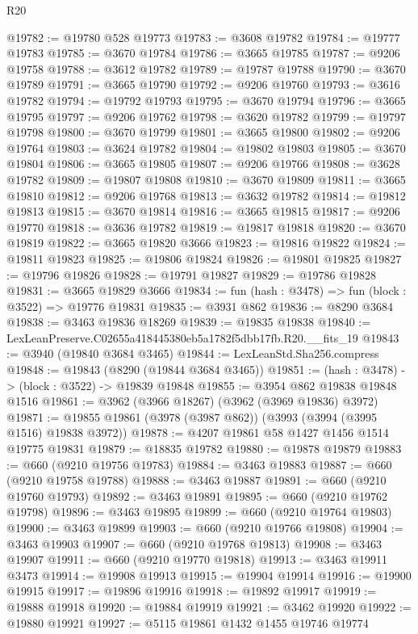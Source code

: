 \begin{lexlean}{R20}
\begin{coremodule}
@19782 := @19780 @528 @19773
@19783 := @3608 @19782
@19784 := @19777 @19783
@19785 := @3670 @19784
@19786 := @3665 @19785
@19787 := @9206 @19758
@19788 := @3612 @19782
@19789 := @19787 @19788
@19790 := @3670 @19789
@19791 := @3665 @19790
@19792 := @9206 @19760
@19793 := @3616 @19782
@19794 := @19792 @19793
@19795 := @3670 @19794
@19796 := @3665 @19795
@19797 := @9206 @19762
@19798 := @3620 @19782
@19799 := @19797 @19798
@19800 := @3670 @19799
@19801 := @3665 @19800
@19802 := @9206 @19764
@19803 := @3624 @19782
@19804 := @19802 @19803
@19805 := @3670 @19804
@19806 := @3665 @19805
@19807 := @9206 @19766
@19808 := @3628 @19782
@19809 := @19807 @19808
@19810 := @3670 @19809
@19811 := @3665 @19810
@19812 := @9206 @19768
@19813 := @3632 @19782
@19814 := @19812 @19813
@19815 := @3670 @19814
@19816 := @3665 @19815
@19817 := @9206 @19770
@19818 := @3636 @19782
@19819 := @19817 @19818
@19820 := @3670 @19819
@19822 := @3665 @19820 @3666
@19823 := @19816 @19822
@19824 := @19811 @19823
@19825 := @19806 @19824
@19826 := @19801 @19825
@19827 := @19796 @19826
@19828 := @19791 @19827
@19829 := @19786 @19828
@19831 := @3665 @19829 @3666
@19834 := fun (hash : @3478) => fun (block : @3522) => @19776 @19831
@19835 := @3931 @862
@19836 := @8290 @3684
@19838 := @3463 @19836 @18269
@19839 := @19835 @19838
@19840 := LexLeanPreserve.C02655a418445380eb5a1782f5dbb17fb.R20.__fits_19
@19843 := @3940 (@19840 @3684 @3465)
@19844 := LexLeanStd.Sha256.compress
@19848 := @19843 (@8290 (@19844 @3684 @3465))
@19851 := (hash : @3478) -> (block : @3522) -> @19839 @19848
@19855 := @3954 @862 @19838 @19848 @1516
@19861 := @3962 (@3966 @18267) (@3962 (@3969 @19836) @3972)
@19871 := @19855 @19861 (@3978 (@3987 @862)) (@3993 (@3994 (@3995 @1516) @19838 @3972))
@19878 := @4207 @19861 @58 @1427 @1456 @1514 @19775 @19831
@19879 := @18835 @19782
@19880 := @19878 @19879
@19883 := @660 (@9210 @19756 @19783)
@19884 := @3463 @19883
@19887 := @660 (@9210 @19758 @19788)
@19888 := @3463 @19887
@19891 := @660 (@9210 @19760 @19793)
@19892 := @3463 @19891
@19895 := @660 (@9210 @19762 @19798)
@19896 := @3463 @19895
@19899 := @660 (@9210 @19764 @19803)
@19900 := @3463 @19899
@19903 := @660 (@9210 @19766 @19808)
@19904 := @3463 @19903
@19907 := @660 (@9210 @19768 @19813)
@19908 := @3463 @19907
@19911 := @660 (@9210 @19770 @19818)
@19913 := @3463 @19911 @3473
@19914 := @19908 @19913
@19915 := @19904 @19914
@19916 := @19900 @19915
@19917 := @19896 @19916
@19918 := @19892 @19917
@19919 := @19888 @19918
@19920 := @19884 @19919
@19921 := @3462 @19920
@19922 := @19880 @19921
@19927 := @5115 @19861 @1432 @1455 @19746 @19774

\end{coremodule}
\end{lexlean}
